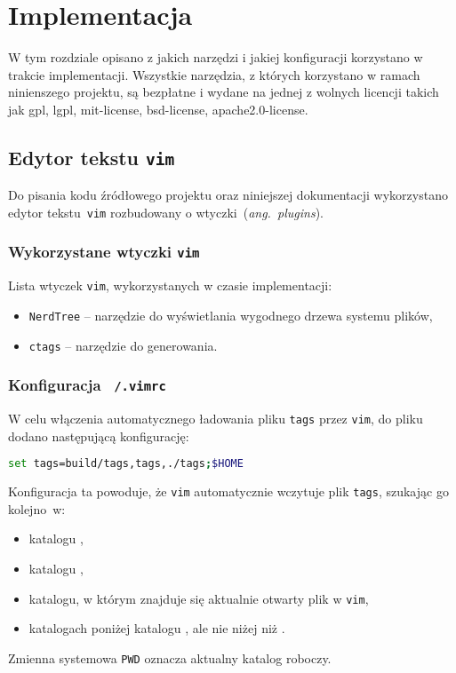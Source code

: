 \documentclass[praca_magisterska]{subfiles}
\begin{document}
\chapter{Implementacja}
\label{chapter:implementacja}

W tym rozdziale opisano z jakich narzędzi i jakiej konfiguracji korzystano w trakcie implementacji. Wszystkie narzędzia, z których korzystano w ramach ninienszego projektu, są bezpłatne i wydane na jednej z wolnych licencji takich jak \gls{gpl}, \gls{lgpl}, \gls{mit-license}, \gls{bsd-license}, \gls{apache2.0-license}.

\section{Edytor tekstu \texttt{vim}}

Do pisania kodu źródłowego projektu oraz niniejszej dokumentacji wykorzystano edytor tekstu~\texttt{vim} rozbudowany o wtyczki~(\emph{ang.~plugins}).

\subsection{Wykorzystane wtyczki \texttt{vim}}

\noindent Lista wtyczek \texttt{vim}, wykorzystanych w czasie implementacji:
\begin{itemize}
	\item\texttt{NerdTree} -- narzędzie do wyświetlania wygodnego drzewa systemu plików,
	\item\texttt{ctags} -- narzędzie do generowania.
\end{itemize}

\subsection{Konfiguracja \texttt{~/.vimrc}}

W celu włączenia automatycznego ładowania pliku \texttt{tags} przez \texttt{vim}, do pliku  dodano następującą konfigurację:
\begin{lstlisting}[language=bash,numbers=none,caption={Konfiguracja \texttt{.vimrc}}]
set tags=build/tags,tags,./tags;$HOME
\end{lstlisting}
Konfiguracja ta powoduje, że \texttt{vim} automatycznie wczytuje plik \texttt{tags}, szukając go kolejno~w:
\begin{itemize}[font=\ttfamily]
	\item katalogu ,
	\item katalogu ,
	\item katalogu, w którym znajduje się aktualnie otwarty plik w \texttt{vim},
	\item katalogach poniżej katalogu , ale nie niżej niż .
\end{itemize}
Zmienna systemowa \texttt{\gls{PWD}} oznacza aktualny katalog roboczy.
\end{document}
